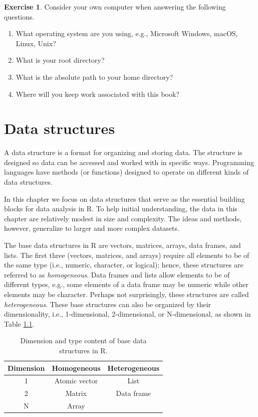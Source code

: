 \documentclass[
  11pt,
]{krantz}
\theoremstyle{definition}
\theoremstyle{definition}
\theoremstyle{definition}
\newtheorem{exercise}{Exercise}[chapter]
\theoremstyle{definition}
\theoremstyle{remark}
\begin{document}
\begin{exercise}
\protect\hypertarget{exr:workflow2}{}\label{exr:workflow2}Consider your own computer when answering the following questions.
\end{exercise}

\begin{enumerate}
\def\labelenumi{\alph{enumi}.}
\item
  What operating system are you using, e.g., Microsoft Windows, macOS, Linux, Unix?
\item
  What is your root directory?
\item
  What is the absolute path to your home directory?
\item
  Where will you keep work associated with this book?
\end{enumerate}

\hypertarget{structures}{%
\chapter{Data structures}\label{structures}}

A data structure is a format for organizing and storing data. The structure is designed so data can be accessed and worked with in specific ways. Programming languages have methods (or functions) designed to operate on different kinds of data structures.

In this chapter we focus on data structures that serve as the essential building blocks for data analysis in R. To help initial understanding, the data in this chapter are relatively modest in size and complexity. The ideas and methods, however, generalize to larger and more complex datasets.

The base data structures in R are vectors, matrices, arrays, data frames, and lists. The first three (vectors, matrices, and arrays) require all elements to be of the same type (i.e., numeric, character, or logical); hence, these structures are referred to as \emph{homogeneous}. Data frames and lists allow elements to be of different types, e.g., some elements of a data frame may be numeric while other elements may be character. Perhaps not surprisingly, these structures are called \emph{heterogeneous}. These base structures can also be organized by their dimensionality, i.e., 1-dimensional, 2-dimensional, or N-dimensional, as shown in Table \ref{tab:dataStructures}.

\begin{table}

\caption{\label{tab:dataStructures}Dimension and type content of base data structures in R.}
\centering
\begin{tabular}[t]{ccc}
\toprule
Dimension & Homogeneous & Heterogeneous\\
\midrule
1 & Atomic vector & List\\
2 & Matrix & Data frame\\
N & Array & \\
\bottomrule
\end{tabular}
\end{table}
\end{document}
